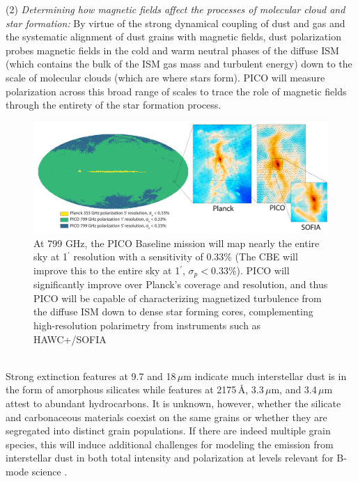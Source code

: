 \documentclass[PICOReport.tex]{subfiles}
\begin{document}
(2) {\em Determining how magnetic fields affect the processes of molecular cloud and star formation:}
By virtue of the strong dynamical coupling of dust and gas and the systematic alignment of dust grains with magnetic fields, dust polarization probes magnetic fields in the cold and warm neutral phases of the diffuse ISM (which contains the bulk of the ISM gas mass and turbulent energy) down to the scale of molecular clouds (which are where stars form). PICO will measure polarization across this broad range of scales to trace the role of magnetic fields through the entirety of the star formation process.
%
%
\begin{figure}
    \centering
    \includegraphics[width=6.5in]{images/galsci_fig_v2.pdf}
    \caption{At 799 GHz, the PICO Baseline mission will map nearly the entire sky at 1$^{\prime}$ resolution with a sensitivity of 0.33\% (The CBE will improve this to the entire sky at 1$^\prime$, $\sigma_p<0.33\%$). PICO will significantly improve over Planck's coverage and resolution, and thus PICO will be capable of characterizing magnetized turbulence from the diffuse ISM down to dense star forming cores, complementing high-resolution polarimetry from instruments such as HAWC+/SOFIA \citep{Chuss2018}}
    \label{fig:allsky}
\end{figure}

\vspace{0.1in}
 \\
Strong extinction features at 9.7 and 18\,$\mu$m indicate much interstellar dust is in the form of amorphous silicates while features at 2175\,\AA, 3.3\,$\mu$m, and 3.4\,$\mu$m attest to abundant hydrocarbons. It is unknown, however, whether the silicate and carbonaceous materials coexist on the same grains or whether they are segregated into distinct grain populations. If there are indeed multiple grain species, this will induce additional challenges for modeling the emission from interstellar dust in both total intensity and polarization at levels relevant for B-mode science \citep{Hensley2018}.
\end{document}
